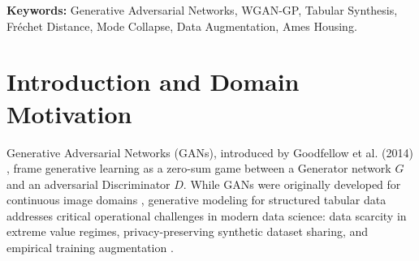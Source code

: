 \documentclass[11pt,letterpaper]{article}
\begin{document}
\begin{abstract}
This report investigates adversarial generative modeling on the benchmark Ames Housing dataset ($N = 2,930$ residential records, 82 raw attributes), establishing an end-to-end framework for synthetic tabular generation, distribution auditing, and downstream data augmentation. Using a strictly leak-free preprocessing pipeline fitted exclusively on the 2,050-property training partition, we construct and benchmark two generative adversarial paradigms: a Vanilla Generative Adversarial Network (Vanilla GAN) utilizing a minimax Jensen-Shannon objective with one-sided label smoothing, and a Wasserstein GAN with 1-Lipschitz Gradient Penalty (WGAN-GP). Quantitative evaluation reveals that WGAN-GP fundamentally outperforms Vanilla GAN across distribution-matching criteria, achieving a Fr\'echet Distance of 0.4719 (versus 0.8582 for Vanilla GAN), a 27.8\% reduction in correlation matrix Frobenius error (3.1115 vs. 4.3136), and superior coverage of the real data manifold without mode collapse. In a controlled downstream data augmentation experiment, retraining the Workshop 2 Multilayer Perceptron (\texttt{HousingMLP}) on augmented synthetic datasets ($N = 4,048$) demonstrates that WGAN-GP data acts as an effective variance regularizer, reducing test Root Mean Squared Error from \$41,283.36 to \$35,777.83 and lifting $R^2$ from 0.7782 to 0.8334 on the untouched 440-property test split. All code, checkpoints, logs, and artifacts are systematically organized and fully reproducible.
\end{abstract}

\noindent\textbf{Keywords:} Generative Adversarial Networks, WGAN-GP, Tabular Synthesis, Fr\'echet Distance, Mode Collapse, Data Augmentation, Ames Housing.

\section{Introduction and Domain Motivation}
Generative Adversarial Networks (GANs), introduced by Goodfellow et al. (2014) \cite{goodfellow2014}, frame generative learning as a zero-sum game between a Generator network $G$ and an adversarial Discriminator $D$. While GANs were originally developed for continuous image domains \cite{radford2015}, generative modeling for structured tabular data addresses critical operational challenges in modern data science: data scarcity in extreme value regimes, privacy-preserving synthetic dataset sharing, and empirical training augmentation \cite{xu2019}.
\end{document}

